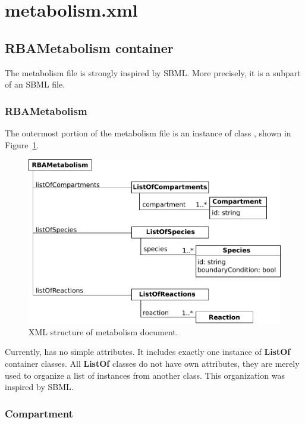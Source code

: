 
\section{metabolism.xml}

\subsection{RBAMetabolism container}

The metabolism file is strongly inspired by SBML.\@
More precisely, it is a subpart of an SBML file.

\subsubsection{RBAMetabolism}
\label{sec:rba_metabolism}

The outermost portion of the metabolism file is an instance of class
\rbametabolism, shown in Figure~\ref{fig:metabolism_doc}.

\begin{figure}
  \centering
  \includegraphics[scale=0.9]{figures/metabolism_doc}
  \caption{XML structure of metabolism document.}
\label{fig:metabolism_doc}
\end{figure}

Currently, \rbametabolism{} has no simple attributes.
It includes exactly one instance of \textbf{ListOf} container classes.
All \textbf{ListOf} classes do not have own attributes,
they are merely used to organize a list of instances from another class.
This organization was inspired by SBML.\@

\subsubsection{Compartment}
\label{sec:compartment}

